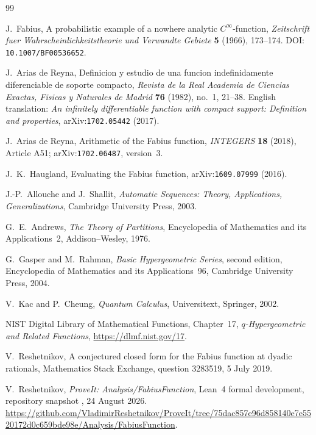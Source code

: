 \documentclass[11pt,oneside]{article}
\theoremstyle{definition}
\theoremstyle{remark}
\begin{document}
\begin{thebibliography}{99}

J.~Fabius,
\newblock A probabilistic example of a nowhere analytic $C^\infty$-function,
\newblock \emph{Zeitschrift fuer Wahrscheinlichkeitstheorie und Verwandte Gebiete}
  \textbf{5} (1966), 173--174.
\newblock DOI: \nolinkurl{10.1007/BF00536652}.

J.~Arias de Reyna,
\newblock Definicion y estudio de una funcion indefinidamente diferenciable de soporte
  compacto,
\newblock \emph{Revista de la Real Academia de Ciencias Exactas, Fisicas y Naturales de
  Madrid} \textbf{76} (1982), no.~1, 21--38.
\newblock English translation: \emph{An infinitely differentiable function with compact
  support: Definition and properties}, arXiv:\nolinkurl{1702.05442} (2017).

J.~Arias de Reyna,
\newblock Arithmetic of the Fabius function,
\newblock \emph{INTEGERS} \textbf{18} (2018), Article A51;
  arXiv:\nolinkurl{1702.06487}, version~3.

J.~K.~Haugland,
\newblock Evaluating the Fabius function,
\newblock arXiv:\nolinkurl{1609.07999} (2016).

J.-P.~Allouche and J.~Shallit,
\newblock \emph{Automatic Sequences: Theory, Applications, Generalizations},
\newblock Cambridge University Press, 2003.

G.~E.~Andrews,
\newblock \emph{The Theory of Partitions},
\newblock Encyclopedia of Mathematics and its Applications~2,
  Addison--Wesley, 1976.

G.~Gasper and M.~Rahman,
\newblock \emph{Basic Hypergeometric Series}, second edition,
\newblock Encyclopedia of Mathematics and its Applications~96,
  Cambridge University Press, 2004.

V.~Kac and P.~Cheung,
\newblock \emph{Quantum Calculus},
\newblock Universitext, Springer, 2002.

NIST Digital Library of Mathematical Functions, Chapter~17,
\newblock \emph{$q$-Hypergeometric and Related Functions},
\newblock \url{https://dlmf.nist.gov/17}.

V.~Reshetnikov,
\newblock A conjectured closed form for the Fabius function at dyadic rationals,
\newblock Mathematics Stack Exchange, question 3283519, 5 July 2019.

V.~Reshetnikov,
\newblock \emph{ProveIt: Analysis/FabiusFunction},
\newblock Lean~4 formal development, repository snapshot
  , 24 August 2026.
\newblock \url{https://github.com/VladimirReshetnikov/ProveIt/tree/75dac857e96d858140e7e5520172d0c659bde98e/Analysis/FabiusFunction}.


\end{thebibliography}
\end{document}

